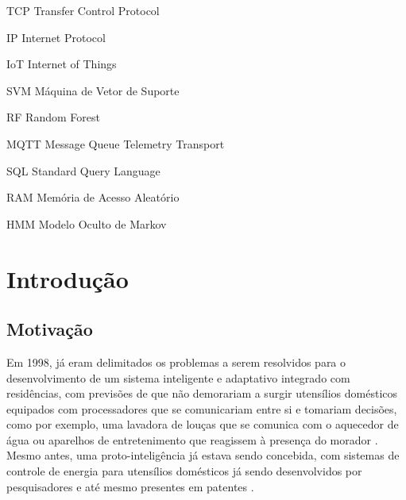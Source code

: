 \documentclass[
	12pt,				%
	openright,			%
	twoside,			%
	a4paper,			%
	english,			%
	spanish,			%
	brazil,				%
	]{abntex2}\usepackage[]{graphicx}\usepackage[]{color}
\begin{document}
\listoffigures*
\cleardoublepage

\begin{siglas}
	
  \item[TCP] Transfer Control Protocol	
  \item[IP] Internet Protocol
  \item[IoT] Internet of Things
  \item[SVM] Máquina de Vetor de Suporte
  \item[RF] Random Forest
  \item[MQTT] Message Queue Telemetry Transport
  \item[SQL] Standard Query Language
  \item[RAM] Memória de Acesso Aleatório
  \item[HMM] Modelo Oculto de Markov
  
  
\end{siglas}


\tableofcontents*
\cleardoublepage

\textual

\chapter{Introdução}

\section{Motivação}
Em 1998, já eram delimitados os problemas a serem resolvidos para o desenvolvimento de um sistema inteligente e adaptativo integrado com residências, com previsões de que não demorariam a surgir utensílios domésticos equipados com processadores que se comunicariam entre si e tomariam decisões, como por exemplo, uma lavadora de louças que se comunica com o aquecedor de água ou aparelhos de entretenimento que reagissem à presença do morador  \cite{Mozer1998}. Mesmo antes, uma proto-inteligência já estava sendo concebida, com sistemas de controle de energia para utensílios domésticos já sendo desenvolvidos por pesquisadores \cite{Hunt1986} e até mesmo presentes em patentes \cite{carr1987home}.
\end{document}
